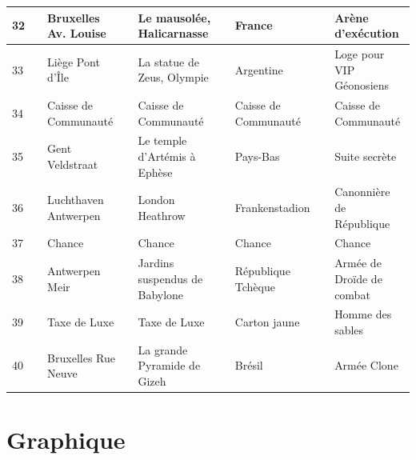 \documentclass[letterpaper]{article}
\begin{document}
{\begin{tabular}{|l|l|l|l|l|l|l|l|l|}
      32 & \cellcolor[HTML]{2E8B57} & Bruxelles Av. Louise & \cellcolor[HTML]{2E8B57} & Le mausolée, Halicarnasse & \cellcolor[HTML]{2E8B57} & France & \cellcolor[HTML]{2E8B57} & Arène d'exécution \\ \hline
      33 & \cellcolor[HTML]{2E8B57} & Liège Pont d'Île & \cellcolor[HTML]{2E8B57} & La statue de Zeus, Olympie & \cellcolor[HTML]{2E8B57} & Argentine & \cellcolor[HTML]{2E8B57} & Loge pour VIP Géonosiens \\ \hline
      34 & \cellcolor[HTML]{EEEED1} & Caisse de Communauté & \cellcolor[HTML]{EEEED1} & Caisse de Communauté & \cellcolor[HTML]{EEEED1} & Caisse de Communauté & \cellcolor[HTML]{EEEED1} & Caisse de Communauté \\ \hline
      35 & \cellcolor[HTML]{2E8B57} & Gent Veldstraat & \cellcolor[HTML]{2E8B57} & Le temple d'Artémis à Ephèse & \cellcolor[HTML]{2E8B57} & Pays-Bas & \cellcolor[HTML]{2E8B57} & Suite secrète \\ \hline
      36 & \cellcolor[HTML]{E6E6FA} & Luchthaven Antwerpen & \cellcolor[HTML]{E6E6FA} & London Heathrow & \cellcolor[HTML]{E6E6FA} & Frankenstadion & \cellcolor[HTML]{E6E6FA} & Canonnière de République \\ \hline
      37 & \cellcolor[HTML]{FFC1C1} & Chance & \cellcolor[HTML]{FFC1C1} & Chance & \cellcolor[HTML]{FFC1C1} & Chance & \cellcolor[HTML]{FFC1C1} & Chance \\ \hline
      38 & \cellcolor[HTML]{483D8B} & Antwerpen Meir & \cellcolor[HTML]{483D8B} & Jardins suspendus de Babylone & \cellcolor[HTML]{483D8B} & République Tchèque & \cellcolor[HTML]{483D8B} & Armée de Droïde de combat \\ \hline
      39 & \cellcolor[HTML]{8B1A1A} & Taxe de Luxe & \cellcolor[HTML]{8B1A1A} & Taxe de Luxe & \cellcolor[HTML]{8B1A1A} & Carton jaune & \cellcolor[HTML]{8B1A1A} & Homme des sables \\ \hline
      40 & \cellcolor[HTML]{483D8B} & Bruxelles Rue Neuve & \cellcolor[HTML]{483D8B} & La grande Pyramide de Gizeh &\cellcolor[HTML]{483D8B} & Brésil &\cellcolor[HTML]{483D8B} & Armée Clone\\ \hline
      \end{tabular}
    }

    \newpage

    \section{Graphique}
      \label{annexe:graphe}
\end{document}
